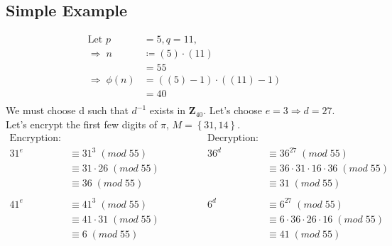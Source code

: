 \documentclass{article}
\begin{document}
\subsection{Simple Example}
\begin{align*}
    \text{Let }     p       & = 5, q = 11,               \\
    \Rightarrow\;   n       & \coloneqq (5) \cdot (11)   \\
                            & = 55                       \\
    \Rightarrow \;  \phi(n) & = ((5) -1) \cdot ((11) -1) \\
                            & = 40                       \\
\end{align*}
We must choose d such that $d^{-1}$ exists in $\mathbf{Z}_{40}$.
Let's choose $e = 3 \Rightarrow d = 27$. \\
Let's encrypt the first few digits of $\pi$, $M = \left\{31, 14 \right\}$.
\begin{equation*}
    \begin{aligned}
        \text{Encryption:}                        \\
        31^e & \equiv 31^{3}      \; (mod \; 55)  \\
             & \equiv 31 \cdot 26 \; (mod \; 55)  \\
             & \equiv 36           \; (mod \; 55) \\
        \\
        41^e & \equiv 41^{3}      \; (mod \; 55)  \\
             & \equiv 41 \cdot 31 \; (mod \; 55)  \\
             & \equiv 6           \; (mod \; 55)  \\
    \end{aligned}
    \qquad \qquad
    \begin{aligned}
        \text{Decryption:}                                         \\
        36^d & \equiv 36^{27}                       \; (mod \; 55) \\
             & \equiv 36 \cdot 31 \cdot 16 \cdot 36 \; (mod \; 55) \\
             & \equiv 31                            \; (mod \; 55) \\
        \\
        6^d  & \equiv 6^{27}                       \; (mod \; 55)  \\
             & \equiv 6 \cdot 36 \cdot 26 \cdot 16 \; (mod \; 55)  \\
             & \equiv 41                            \; (mod \; 55) \\
    \end{aligned}
\end{equation*}
\end{document}
